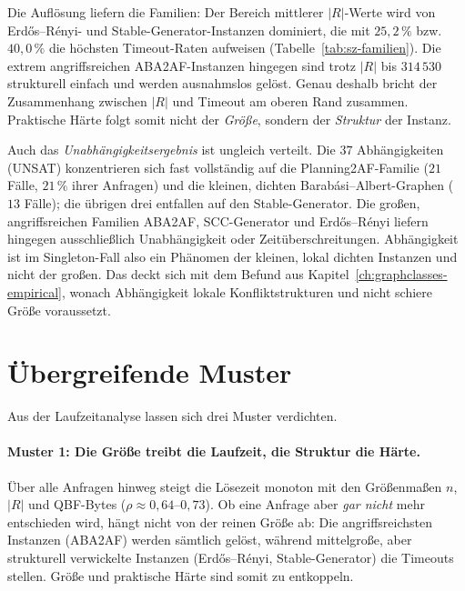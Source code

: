 Die Aufl\"osung liefern die Familien: Der Bereich mittlerer \(|R|\)-Werte wird
von Erd\H{o}s--R\'enyi- und Stable-Generator-Instanzen dominiert, die mit
\(25{,}2\,\%\) bzw.\ \(40{,}0\,\%\) die h\"ochsten Timeout-Raten aufweisen
(Tabelle~\ref{tab:sz-familien}). Die extrem angriffsreichen ABA2AF-Instanzen
hingegen sind trotz \(|R|\) bis \(314\,530\) strukturell einfach und
werden ausnahmslos gel\"ost. Genau deshalb bricht der Zusammenhang zwischen
\(|R|\) und Timeout am oberen Rand zusammen. Praktische H\"arte folgt somit
nicht der \emph{Gr\"o\ss e}, sondern der \emph{Struktur} der Instanz.

Auch das \emph{Unabh\"angigkeitsergebnis} ist ungleich verteilt. Die
\(37\) Abh\"angigkeiten (UNSAT) konzentrieren sich fast vollst\"andig auf die
Planning2AF-Familie (\(21\) F\"alle, \(21\,\%\) ihrer Anfragen) und die
kleinen, dichten Barab\'asi--Albert-Graphen (\(13\) F\"alle); die \"ubrigen
drei entfallen auf den Stable-Generator. Die gro\ss en, angriffsreichen
Familien ABA2AF, SCC-Generator und Erd\H{o}s--R\'enyi liefern hingegen
ausschlie\ss lich Unabh\"angigkeit oder Zeit\"uberschreitungen. Abh\"angigkeit
ist im Singleton-Fall also ein Ph\"anomen der kleinen, lokal dichten
Instanzen und nicht der gro\ss en. Das deckt sich mit dem Befund aus
Kapitel~\ref{ch:graphclasses-empirical}, wonach Abh\"angigkeit lokale
Konfliktstrukturen und nicht schiere Gr\"o\ss e voraussetzt.

\section{\"Ubergreifende Muster}
\label{sec:sz-zusammenfassung}

Aus der Laufzeitanalyse lassen sich drei Muster verdichten.

\paragraph{Muster 1: Die Gr\"o\ss e treibt die Laufzeit, die Struktur die
H\"arte.} \"Uber alle Anfragen hinweg steigt die L\"osezeit monoton mit den
Gr\"o\ss enma\ss en \(n\), \(|R|\) und QBF-Bytes
(\(\rho \approx 0{,}64\text{--}0{,}73\)). Ob eine Anfrage aber \emph{gar nicht}
mehr entschieden wird, h\"angt nicht von der reinen Gr\"o\ss e ab: Die
angriffsreichsten Instanzen (ABA2AF) werden s\"amtlich gel\"ost, w\"ahrend
mittelgro\ss e, aber strukturell verwickelte Instanzen (Erd\H{o}s--R\'enyi,
Stable-Generator) die Timeouts stellen. Gr\"o\ss e und praktische H\"arte sind
somit zu entkoppeln.

